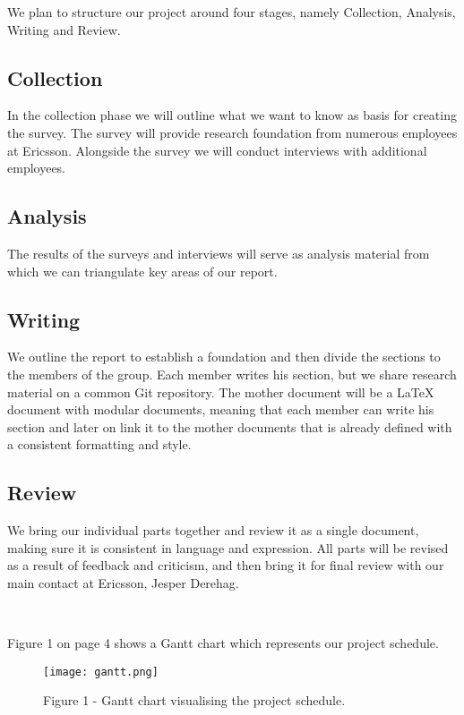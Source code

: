 \documentclass[ProjectPlan_innit.tex]{subfiles}
\begin{document}
We plan to structure our project around four stages, namely Collection, Analysis, Writing and Review. 

\subsection{Collection}
In the collection phase we will outline what we want to know as basis for creating the survey. The survey will provide research foundation from numerous employees at Ericsson. Alongside the survey we will conduct interviews with additional employees. 

\subsection{Analysis}
The results of the surveys and interviews will serve as analysis material from which we can triangulate key areas of our report.

\subsection{Writing}
We outline the report to establish a foundation and then divide the sections to the members of the group. Each member writes his section, but we share research material on a common Git repository. The mother document will be a LaTeX document with modular documents, meaning that each member can write his section and later on link it to the mother documents that is already defined with a consistent formatting and style.

\subsection{Review}
We bring our individual parts together and review it as a single document, making sure it is consistent in language and expression. All parts will be revised as a result of feedback and criticism, and then bring it for final review with our main contact at Ericsson, Jesper Derehag.  

\hspace{0pt} \

Figure 1 on page 4 shows a Gantt chart which represents our project schedule. 

\begin{figure*}[H!]
	\texttt{[image: gantt.png]}
	\caption{Figure 1 - Gantt chart visualising the project schedule.}
	\label{AAA}
\end{figure*}
\end{document}
